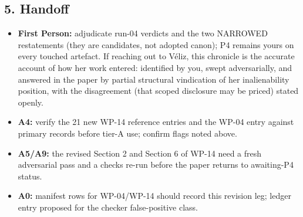 \documentclass[
  11pt,
]{article}
\providecommand{\tightlist}{%
  \setlength{\itemsep}{0pt}\setlength{\parskip}{0pt}}
\begin{document}
\subsection{5. Handoff}\label{handoff}

\begin{itemize}
\tightlist
\item
  \textbf{First Person:} adjudicate run-04 verdicts and the two NARROWED
  restatements (they are candidates, not adopted canon); P4 remains
  yours on every touched artefact. If reaching out to Véliz, this
  chronicle is the accurate account of how her work entered: identified
  by you, swept adversarially, and answered in the paper by partial
  structural vindication of her inalienability position, with the
  disagreement (that scoped disclosure may be priced) stated openly.
\item
  \textbf{A4:} verify the 21 new WP-14 reference entries and the WP-04
  entry against primary records before tier-A use; confirm flags noted
  above.
\item
  \textbf{A5/A9:} the revised Section 2 and Section 6 of WP-14 need a
  fresh adversarial pass and a checks re-run before the paper returns to
  awaiting-P4 status.
\item
  \textbf{A0:} manifest rows for WP-04/WP-14 should record this revision
  leg; ledger entry proposed for the checker false-positive class.
\end{itemize}
\end{document}
